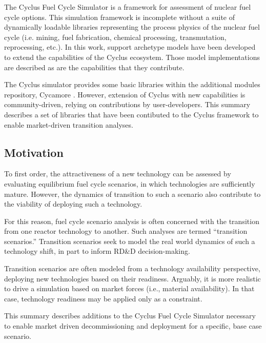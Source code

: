 
The Cyclus Fuel Cycle Simulator \cite{carlsen_cyclus_2014} is a framework for 
assessment of nuclear fuel cycle options. This simulation framework is 
incomplete without a suite of dynamically loadable libraries representing the 
process physics of the nuclear fuel cycle (i.e. mining, fuel fabrication, 
chemical processing, transmutation, reprocessing, etc.).  In this work, support 
archetype models have been developed to extend the capabilities of the Cyclus 
ecosystem. Those model implementations are described as are the capabilities 
that they contribute. 

The Cyclus simulator provides some basic libraries within the additional 
modules repository, Cycamore \cite{carlsen_cyclus_2014}. However, extension of 
Cyclus with new capabilities is community-driven, relying on contributions by 
user-developers.  This summary describes a set of libraries that have been 
contibuted to the Cyclus framework to enable market-driven transition analyses. 

\subsection{Motivation}

To first order, the attractiveness of a new technology can be assessed by 
evaluating equilibrium fuel cycle scenarios, in which technologies are 
sufficiently mature. However, the dynamics of transition to such a scenario also 
contribute to the viability of deploying such a technology. 

For this reason, fuel cycle scenario analysis is often concerned with the 
transition from one reactor technology to another. Such analyses are termed 
``transition scenarios.''  Transition scenarios seek to model the real world 
dynamics of such a technology shift, in part to inform RD\&D decision-making. 

Transition scenarios are often modeled from a technology availability 
perspective, deploying new technologies based on their readiness.  Arguably, it 
is more realistic to drive a simulation based on market forces (i.e., material 
availability). In that case, technology readiness may be applied only as a 
constraint. 

This summary describes additions to the Cyclus Fuel Cycle Simulator necessary 
to enable market driven decommissioning and deployment for a specific, base 
case scenario.  

